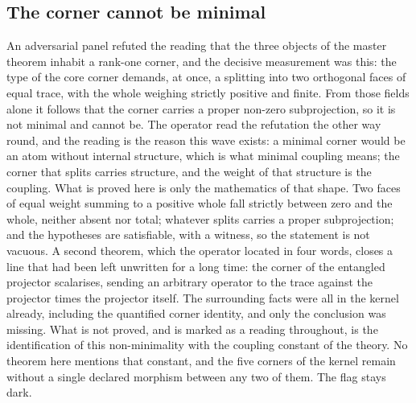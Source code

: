 \documentclass[11pt]{article}
\theoremstyle{definition}\newtheorem{deriv}{Derivation}
\begin{document}
\subsection*{The corner cannot be minimal}An adversarial panel refuted the reading that the three objects of the master theorem inhabit a rank-one corner, and the decisive measurement was this: the type of the core corner demands, at once, a splitting into two orthogonal faces of equal trace, with the whole weighing strictly positive and finite. From those fields alone it follows that the corner carries a proper non-zero subprojection, so it is not minimal and cannot be. The operator read the refutation the other way round, and the reading is the reason this wave exists: a minimal corner would be an atom without internal structure, which is what minimal coupling means; the corner that splits carries structure, and the weight of that structure is the coupling. What is proved here is only the mathematics of that shape. Two faces of equal weight summing to a positive whole fall strictly between zero and the whole, neither absent nor total; whatever splits carries a proper subprojection; and the hypotheses are satisfiable, with a witness, so the statement is not vacuous. A second theorem, which the operator located in four words, closes a line that had been left unwritten for a long time: the corner of the entangled projector scalarises, sending an arbitrary operator to the trace against the projector times the projector itself. The surrounding facts were all in the kernel already, including the quantified corner identity, and only the conclusion was missing. What is not proved, and is marked as a reading throughout, is the identification of this non-minimality with the coupling constant of the theory. No theorem here mentions that constant, and the five corners of the kernel remain without a single declared morphism between any two of them. The flag stays dark.
\end{document}

